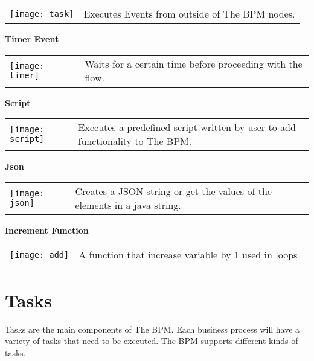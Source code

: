 \begin{tabular}{C{2.2cm}  L{10cm}}
    \texttt{[image: task]} &Executes Events from outside of The BPM nodes.

\end{tabular}

\par\vspace {1cm}

\large \textbf{Timer Event}\\

\begin{tabular}{C{2.2cm}  L{10cm}}
    \texttt{[image: timer]} &Waits for a certain time before proceeding with the flow.
\end{tabular}

\par\vspace {1cm}

\large \textbf{Script}\\

\begin{tabular}{C{2.2cm}  L{10cm}}
    \texttt{[image: script]} &Executes a predefined script written by user to add functionality to The
    BPM.
\end{tabular}

\par\vspace {1cm}

\large \textbf{Json}\\

\begin{tabular}{C{2.2cm}  L{10cm}}
    \texttt{[image: json]} &Creates a JSON string or get the values of the elements in a java string.
\end{tabular}

\par\vspace {1cm}

\large \textbf{Increment Function}\\

\begin{tabular}{C{2.2cm}  L{10cm}}
    \texttt{[image: add]} &A function that increase variable by 1 used in loops
\end{tabular}


\section{Tasks}

Tasks are the main components of The BPM. Each business process will have a variety of tasks that
need to be executed. The BPM supports different kinds of tasks.

